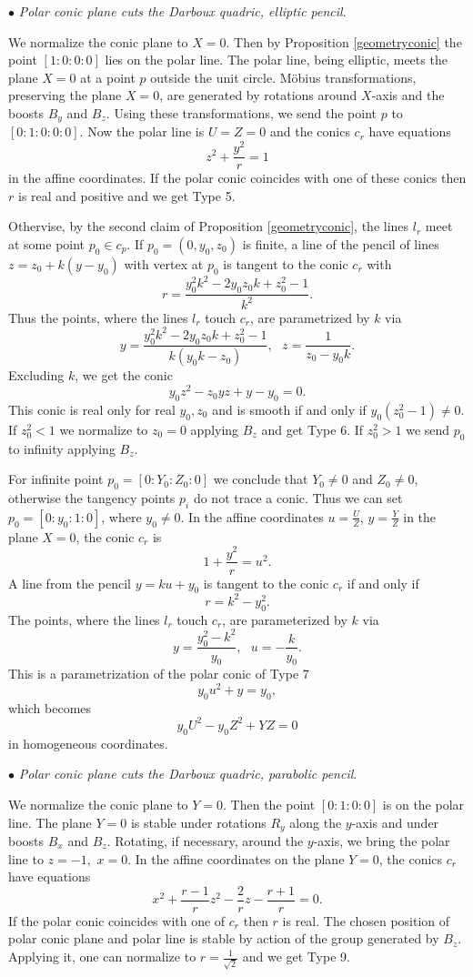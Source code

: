 \documentclass[11pt,a4paper]{article}
\begin{document}
     
 \smallskip     
 $\bullet${ \it Polar conic plane cuts the Darboux quadric, elliptic pencil}.
 
 \smallskip 
We normalize the conic plane to $X=0$. Then by Proposition \ref{geometryconic} the point $[1:0:0:0]$ lies on the polar line.    The polar line, being elliptic, meets the plane $X=0$ at a point $p$ outside the unit circle. M\" obius transformations, preserving the plane $X=0$, are generated by rotations around $X$-axis and the boosts $B_y$ and $B_z$. Using these transformations, we send the point $p$ to $[0:1:0:0:0]$. Now the polar line is $U=Z=0$ and the conics $c_r$ have equations
$$
z^2+\frac{ y^2}{r}=1
$$ in the affine coordinates.  
If the polar conic coincides with one of these conics then $r$ is real and positive and we get Type 5.     


 Othervise, by the second claim of Proposition \ref{geometryconic}, the lines $l_r$ meet at some point $p_0\in c_p$. If $p_0=(0,y_0,z_0)$ is finite, a line of the pencil of lines $z=z_0+k(y - y_0)$ with vertex at $p_0$ is tangent to the conic $c_r$ with
$$
r=\frac{y_0^2k^2 - 2y_0z_0k + z_0^2 - 1}{k^2}. 
$$ Thus the points, where the lines $l_r$ touch $c_r$, are parametrized by $k$ via 
$$
y=\frac{y_0^2k^2 - 2y_0z_0k + z_0^2 - 1}{k(y_0k - z_0)}, \ \ \ z=\frac{1}{z_0-y_0k}. 
$$ 
Excluding $k$, we get the conic
$$
y_0z^2-z_0yz  + y - y_0=0.
$$
This conic is real only for real $y_0,z_0$ and is smooth if and only if $y_0(z^2_0-1)\ne 0.$
 If $z^2_0<1$ we normalize to $z_0=0$ applying $B_z$ and get Type 6. If $z^2_0> 1$ we send $p_0$ to infinity applying $B_z$.

For infinite point $p_0=[0:Y_0:Z_0:0]$ we conclude that $Y_0\ne 0$  and $Z_0\ne 0$, otherwise the tangency points $p_i$ do not trace a conic. Thus we can set $p_0=[0:y_0:1:0]$, where $y_0\ne 0$. In the affine coordinates $u=\frac{U}{Z}$, $y=\frac{Y}{Z}$ in the plane $X=0$, the conic $c_r$ is $$1+\frac{y^2}{r}=u^2.$$ A line from the pencil $y=ku+y_0$ is tangent to the conic $c_r$ if and only if 
$$
r=k^2 - y_0^2. 
$$
The points, where the lines $l_r$ touch $c_r$, are parameterized by $k$ via 
$$
y=\frac{y_0^2 - k^2}{y_0}, \ \ \ u=-\frac{k}{y_0}.
$$ 
This is a parametrization of the polar conic of Type 7    
$$
y_0u^2 + y = y_0,
$$
which becomes  
$$
y_0U^2 - y_0Z^2 + YZ=0
$$
in homogeneous coordinates. 

 \smallskip     
 $\bullet${ \it Polar conic plane cuts the Darboux quadric, parabolic pencil}.
 
 \smallskip 
We normalize the conic plane to $Y=0$. Then the point $[0:1:0:0]$ is on the polar line. 
 The plane $Y=0$ is stable under rotations $R_y$ along the $y$-axis and under boosts $B_x$ and $B_z$. 
Rotating, if necessary, around the $y$-axis, we bring the polar line to $z=-1,$ $x=0.$ In the affine coordinates on the plane $Y=0$, the conics $c_r$ have equations 
$$
x^2 + \frac{r-1}{r}z^2 - \frac{2}{r}z - \frac{r+1}{r}=0.
$$
If the polar conic coincides with one of $c_r$ then $r$ is real. The chosen position of polar conic plane and polar line is stable by action of the group generated by $B_z$. Applying it, one can normalize to $r=\frac{1}{\sqrt{2}}$ and we get Type 9. 
\end{document}
